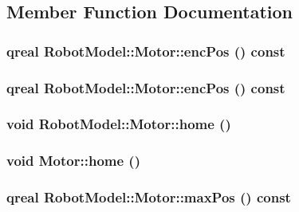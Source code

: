 \subsection{Member Function Documentation}
\hypertarget{class_robot_model_1_1_motor_a8f95b65d6bf72038a4aca3a394609354}{
\subsubsection[{encPos}]{\setlength{\rightskip}{0pt plus 5cm}qreal RobotModel::Motor::encPos () const}}
\label{class_robot_model_1_1_motor_a8f95b65d6bf72038a4aca3a394609354}
\hypertarget{class_robot_model_1_1_motor_a8f95b65d6bf72038a4aca3a394609354}{
\subsubsection[{encPos}]{\setlength{\rightskip}{0pt plus 5cm}qreal RobotModel::Motor::encPos () const}}
\label{class_robot_model_1_1_motor_a8f95b65d6bf72038a4aca3a394609354}
\hypertarget{class_robot_model_1_1_motor_a65b92706160d761b0abb2dfc462d832e}{
\subsubsection[{home}]{\setlength{\rightskip}{0pt plus 5cm}void RobotModel::Motor::home ()}}
\label{class_robot_model_1_1_motor_a65b92706160d761b0abb2dfc462d832e}
\hypertarget{class_robot_model_1_1_motor_ae8e0845a9284fbf8013137bf6b1f9293}{
\subsubsection[{home}]{\setlength{\rightskip}{0pt plus 5cm}void Motor::home ()}}
\label{class_robot_model_1_1_motor_ae8e0845a9284fbf8013137bf6b1f9293}
\hypertarget{class_robot_model_1_1_motor_abd6baf3a9ae74dcf970663e5ee303131}{
\subsubsection[{maxPos}]{\setlength{\rightskip}{0pt plus 5cm}qreal RobotModel::Motor::maxPos () const}}
